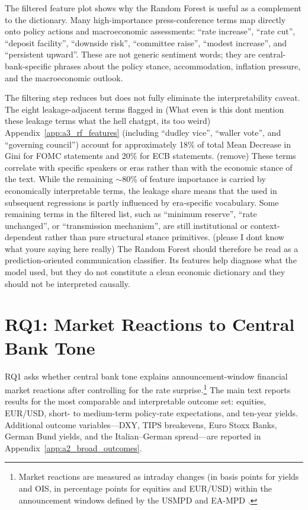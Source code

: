 The filtered feature plot shows why the Random Forest is useful as a complement
to the dictionary. Many high-importance press-conference terms map directly onto
policy actions and macroeconomic assessments: ``rate increase'', ``rate cut'',
``deposit facility'', ``downside risk'', ``committee raise'', ``modest
increase'', and ``persistent upward''. These are not generic sentiment words;
they are central-bank-specific phrases about the policy stance, accommodation,
inflation pressure, and the macroeconomic outlook.

The filtering step reduces but does not fully eliminate the interpretability
caveat. The eight leakage-adjacent terms flagged in (What even is this dont mention these leakage terms what the hell chatgpt, its too weird)
Appendix~\ref{app:a3_rf_features} (including ``dudley vice'', ``waller
vote'', and ``governing council'') account for approximately 18\% of total
Mean Decrease in Gini for FOMC statements and 20\% for ECB statements. (remove) These
terms correlate with specific speakers or eras rather than with the economic
stance of the text. While the remaining $\sim$80\% of feature importance is
carried by economically interpretable terms, the leakage share means that the
\rfscore{} used in subsequent regressions is partly influenced by era-specific
vocabulary. Some remaining terms in the filtered list, such as ``minimum
reserve'', ``rate unchanged'', or ``transmission mechanism'', are still
institutional or context-dependent rather than pure structural stance
primitives. (please I dont know what youre saying here really) The Random Forest should therefore be read as a
prediction-oriented communication classifier. Its features help diagnose what
the model used, but they do not constitute a clean economic dictionary and
they should not be interpreted causally.

\section{RQ1: Market Reactions to Central Bank Tone}
\label{sec:res_rq1_new}

RQ1 asks whether central bank tone explains announcement-window financial
market reactions after controlling for the rate surprise.\footnote{Market
reactions are measured as intraday changes (in basis points for yields and OIS,
in percentage points for equities and EUR/USD) within the announcement windows
defined by the USMPD \citep{acosta2025} and EA-MPD \citep{altavilla2019}.} The
main text reports results for the most comparable and interpretable outcome
set: equities, EUR/USD, short- to medium-term policy-rate expectations, and
ten-year yields. Additional outcome variables---DXY, TIPS breakevens, Euro
Stoxx Banks, German Bund yields, and the Italian--German spread---are reported
in Appendix~\ref{app:a2_broad_outcomes}.

